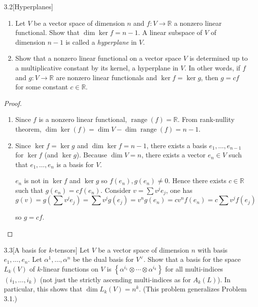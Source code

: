 \begin{problem}{3.2}[Hyperplanes]
\begin{enumerate}[label={(\alph*)},itemsep=0pt]
    \item Let \( V \) be a vector space of dimension \( n \) and \( f \colon V \to \mathbb{R} \) a nonzero linear functional. Show that \( \dim \ker f = n - 1 \). A linear subspace of \( V \) of dimension \( n - 1 \) is called a \textit{hyperplane} in \( V \).
    \item Show that a nonzero linear functional on a vector space \( V \) is determined up to a multiplicative constant by its kernel, a hyperplane in \( V \). In other words, if \( f \) and \( g \colon V \to \mathbb{R} \) are nonzero linear functionals and \( \ker f = \ker g \), then \( g = c f \) for some constant \( c \in \mathbb{R} \).
\end{enumerate}
\end{problem}

\begin{proof}
    \begin{enumerate}[label={(\alph*)}]
        \item Since \( f \) is a nonzero linear functional, \( \operatorname{range}(f) = \mathbb{R} \). From rank-nullity theorem, \( \dim \ker(f) = \dim V - \dim \operatorname{range}(f) = n - 1 \).
        \item Since \( \ker f = \ker g \) and \( \dim \ker f = n - 1 \), there exists a basis \( e_{1}, \ldots, e_{n-1} \) for \( \ker f \) (and \( \ker g \)). Because \( \dim V = n \), there exists a vector \( e_{n} \in V \) such that \( e_{1}, \ldots, e_{n} \) is a basis for \( V \).

              \( e_{n} \) is not in \( \ker f \) and \( \ker g \) so \( f(e_{n}), g(e_{n}) \ne 0 \). Hence there exists \( c \in \mathbb{R} \) such that \( g(e_{n}) = cf(e_{n}) \). Consider \( v = \sum v^{j}e_{j} \), one has
              \[
                  g(v) = g\left(\sum v^{j}e_{j}\right) = \sum v^{j}g(e_{j}) = v^{n}g(e_{n}) = cv^{n}f(e_{n}) = c\sum v^{j}f(e_{j})
              \]

              so \( g = cf \).\qedhere
    \end{enumerate}
\end{proof}

\begin{problem}{3.3}[A basis for \( k \)-tensors]
Let \( V \) be a vector space of dimension \( n \) with basis \( e_{1}, \ldots, e_{n} \). Let \( \alpha^{1}, \ldots, \alpha^{n} \) be the dual basis for \( V^{\vee} \). Show that a basis for the space \( L_{k}(V) \) of \( k \)-linear functions on \( V \) is \( \left\{ \alpha^{i_{1}} \otimes \cdots \otimes \alpha^{i_{k}} \right\} \) for all multi-indices \( (i_{1}, \ldots, i_{k}) \) (not just the strictly ascending multi-indices as for \( A_{k}(L) \)). In particular, this shows that \( \dim L_{k}(V) = n^{k} \). (This problem generalizes Problem 3.1.)
\end{problem}

